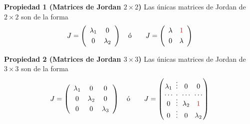 {\nologo
\begin{frame}%

\vspace{-3mm}
\begin{prop}{\textbf{Propiedad 1 (Matrices de Jordan $2\times2$)}}
	Las únicas matrices de Jordan de $2\times 2$ son de la forma
	\[
	J =
	\left(
		\begin{array}{cc}
			\lambda_1 & 0\\[1mm]
			0 & \lambda_2
		\end{array}
	\right)
	\quad \text{ó} \qquad
	J =
	\left(
	\begin{array}{cc}
	\lambda & {\color{red}1}\\[1mm]
	0 & \lambda
	\end{array}
	\right)
	\]
\end{prop}

\vspace{-1mm}
\begin{prop}{\textbf{Propiedad 2 (Matrices de Jordan $3\times 3$)}}
	Las únicas matrices de Jordan de $3\times 3$ son de la forma
	\[
	J =
	\left(
	\begin{array}{ccc}
	\lambda_1 & 0 & 0\\[1mm]
	0 & \lambda_2 & 0\\[1mm]
	0 & 0 & \lambda_3
	\end{array}
	\right)
	\quad \text{ó} \qquad
	J =
	\left(
	\begin{array}{@{\hspace{0.1\tabcolsep}}c@{\hspace{0.8\tabcolsep}}c@{\hspace{\tabcolsep}}c@{\hspace{\tabcolsep}}c@{\hspace{0.1\tabcolsep}}}
	\lambda_1 & \vdots & 0 & 0 \\[0mm]
	\cdots & \cdot  & \cdots & \cdots \\[-2mm]
	0 & \vdots & \lambda_2 & {\color{red}1} \\[-0.5mm]		
	0 & \vdots & 0 & \lambda_2 \\
	\end{array}
	\right)
	\]
	

\end{prop}
\end{frame}}

